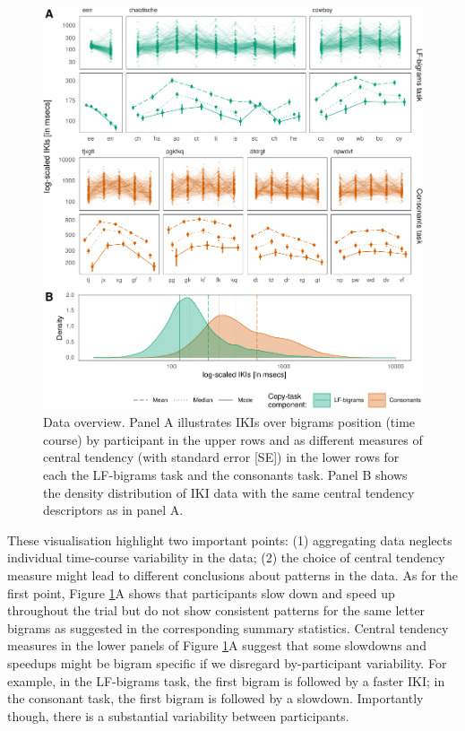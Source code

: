 \documentclass[
  english,
  man,mask,floatsintext]{apa7}
\begin{document}
\begin{figure}[!ht]

{\centering \includegraphics{report_files/figure-latex/descriptives-1} 

}

\caption{Data overview. Panel A illustrates IKIs over bigrams position (time course) by participant in the upper rows and as different measures of central tendency (with standard error [SE]) in the lower rows for each the LF-bigrams task and the consonants task. Panel B shows the density distribution of IKI data with the same central tendency descriptors as in panel A.}\label{fig:descriptives}
\end{figure}

These visualisation highlight two important points: (1) aggregating data neglects individual time-course variability in the data; (2) the choice of central tendency measure might lead to different conclusions about patterns in the data. As for the first point, Figure \ref{fig:descriptives}A shows that participants slow down and speed up throughout the trial but do not show consistent patterns for the same letter bigrams as suggested in the corresponding summary statistics. Central tendency measures in the lower panels of Figure \ref{fig:descriptives}A suggest that some slowdowns and speedups might be bigram specific if we disregard by-participant variability. For example, in the LF-bigrams task, the first bigram is followed by a faster IKI; in the consonant task, the first bigram is followed by a slowdown. Importantly though, there is a substantial variability between participants.
\end{document}
